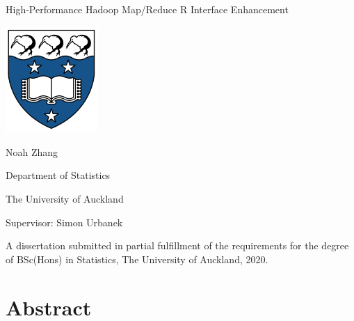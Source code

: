 \documentclass[11pt]{book}
\begin{document}
\pagestyle{empty}


\begin{center}

\vspace{1cm}

{\Huge         High-Performance Hadoop Map/Reduce R Interface Enhancement}

\vspace{25mm} 

\includegraphics[width=3.5cm]{logo}

 \vspace{35mm}

{\Large       Noah Zhang}

	\vspace{1ex}

Department of Statistics

The University of Auckland

	\vspace{5ex}

Supervisor:             Simon Urbanek

	\vspace{30mm}

A dissertation submitted in partial fulfillment of the requirements for the degree of BSc(Hons) in Statistics, The University of Auckland, 2020.

\end{center}

\newpage


\chapter*{Abstract}       
\setcounter{page}{1}
\pagestyle{headings}
\end{document}
